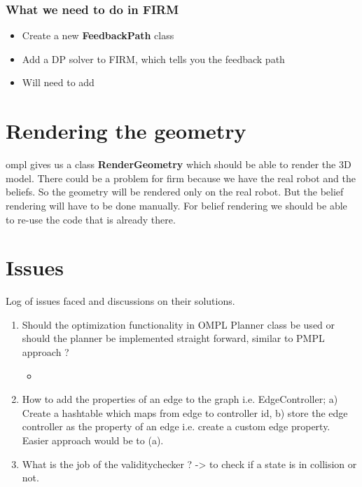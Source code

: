 \subsubsection{What we need to do in FIRM}

\begin{itemize}
 \item Create a new \textbf{FeedbackPath} class
 \item Add a DP solver to FIRM, which tells you the feedback path
 \item Will need to add 
\end{itemize}

\section{Rendering the geometry}

ompl gives us a class \textbf{RenderGeometry} which should be able to render the 3D model. There could be a problem for firm because we have the
real robot and the beliefs. So the geometry will be rendered only on the real robot. But the belief rendering will have to be done manually.
For belief rendering we should be able to re-use the code that is already there.

\section{Issues}
Log of issues faced and discussions on their solutions.

\begin{enumerate}
 \item Should the optimization functionality in OMPL Planner class be used or should the planner be implemented straight forward, similar to PMPL approach ?
    \begin{itemize}
     \item 
    \end{itemize}
\item How to add the properties of an edge to the graph i.e. EdgeController; a) Create a hashtable which maps from edge to controller id, b) store the edge controller as the property of an edge i.e. create a custom edge property. Easier approach would be to (a).

 \item What is the job of the validitychecker ? -> to check if a state is in collision or not. 

\end{enumerate}
